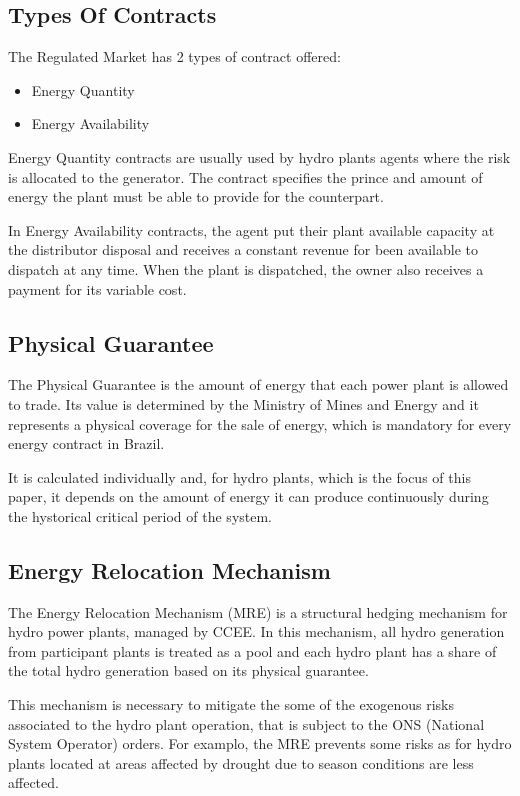 \documentclass[a4paper]{IEEEtran}
\begin{document}
\subsection{Types Of Contracts}
The Regulated Market has 2 types of contract offered:

\begin{itemize}
	\item Energy Quantity 
	\item Energy Availability
\end{itemize}

Energy Quantity contracts are usually used by hydro plants agents where the risk is allocated to the generator. The contract specifies the prince and amount of energy the plant must be able to provide for the counterpart.

In Energy Availability contracts, the agent put their plant available capacity at the distributor disposal and receives a constant revenue for been available to dispatch at any time. When the plant is dispatched, the owner also receives a payment for its variable cost.

\subsection{Physical Guarantee}
The Physical Guarantee is the amount of energy that each power plant is allowed to trade. Its value is determined by the Ministry of Mines and Energy and it represents a physical coverage for the sale of energy, which is mandatory for every energy contract in Brazil. 

It is calculated individually and, for hydro plants, which is the focus of this paper, it depends on the amount of energy it can produce continuously during the hystorical critical period of the system.

\subsection{Energy Relocation Mechanism}
The Energy Relocation Mechanism (MRE) is a structural hedging mechanism for hydro power plants, managed by CCEE. In this mechanism, all hydro generation from participant plants is treated as a pool and each hydro plant has a share of the total hydro generation based on its physical guarantee.

This mechanism is necessary to mitigate the some of the exogenous risks associated to the hydro plant operation, that is subject to the ONS (National System Operator) orders. For examplo, the MRE prevents some risks as for hydro plants located at areas affected by drought due to season conditions are less affected. 
\end{document}
